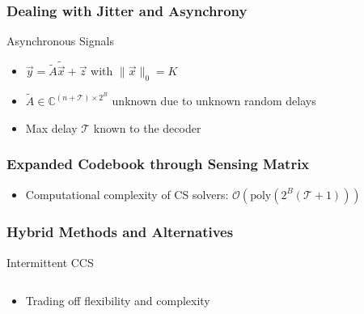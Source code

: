 \documentclass[10pt]{beamer}
\begin{document}
\begin{frame}
\frametitle{Dealing with Jitter and Asynchrony}
\begin{center}
  
\end{center}
\begin{block}{Asynchronous Signals}
  \begin{itemize}
  \item $\vec{y} = \tilde{A} \tilde{\vec{x}} + \vec{z}$ with  $\|\vec{x}\|_0 = K$
  \item $\tilde{A} \in \mathbb{C}^{(n+\mathcal{T}) \times 2^B}$ unknown due to unknown random delays
  \item Max delay $\mathcal{T}$ known to the decoder
  \end{itemize}
\end{block}
\end{frame}


\begin{frame}
\frametitle{Expanded Codebook through Sensing Matrix}
\begin{center}
  
\end{center}
  \begin{itemize}
  \item Computational complexity of CS solvers: $\mathcal{O}(\mathrm{poly}(2^B(\mathcal{T}+1)))$
  \end{itemize}
\end{frame}


\begin{frame}
\frametitle{Hybrid Methods and Alternatives}
\begin{block}{Intermittent CCS}
\begin{columns}
  \begin{center}
  \scalebox{1.0}{}
  \end{center}
  \begin{center}
  \scalebox{1.0}{}
  \end{center}
\end{columns}
\end{block}
\begin{itemize}
\item Trading off flexibility and complexity
\end{itemize}
\end{frame}
\end{document}
